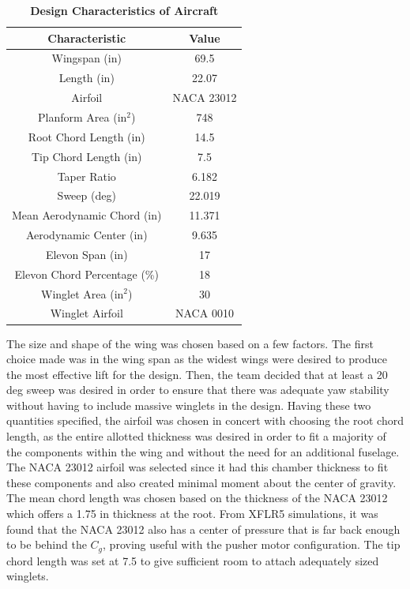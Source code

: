     \begin{table}[H]
    \begin{center}
    \caption{\textbf{Design Characteristics of Aircraft}} \label{table:design_char}
    \begin{tabular}{|c|c|} 
        \hline
        \textbf{Characteristic} & \textbf{Value} \\ \hline
        Wingspan (in) & 69.5 \\ \hline
        Length (in) & 22.07 \\ \hline
        Airfoil & NACA 23012 \\ \hline
        Planform Area (in$^2$) & 748 \\ \hline
        Root Chord Length (in) & 14.5 \\ \hline
        Tip Chord Length (in) & 7.5 \\ \hline
        Taper Ratio & 6.182 \\ \hline
        Sweep (deg) & 22.019 \\ \hline
        Mean Aerodynamic Chord (in) &  11.371 \\ \hline
        Aerodynamic Center (in) & 9.635 \\ \hline
        Elevon Span (in) & 17 \\ \hline
        Elevon Chord Percentage (\%) & 18 \\ \hline
        Winglet Area (in$^2$) & 30 \\ \hline
        Winglet Airfoil & NACA 0010 \\
        \hline
    \end{tabular}
    \end{center}
    \end{table}

    The size and shape of the wing was chosen based on a few factors. The first choice made was in the wing span as the widest wings were desired to produce the most effective lift for the design. Then, the team decided that at least a 20 deg sweep was desired in order to ensure that there was adequate yaw stability without having to include massive winglets in the design. Having these two quantities specified, the airfoil was chosen in concert with choosing the root chord length, as the entire allotted thickness was desired in order to fit a majority of the components within the wing and without the need for an additional fuselage. The NACA 23012 airfoil was selected since it had this chamber thickness to fit these components and also created minimal moment about the center of gravity. The mean chord length was chosen based on the thickness of the NACA 23012 which offers a 1.75 in thickness at the root. From XFLR5 simulations, it was found that the NACA 23012 also has a center of pressure that is far back enough to be behind the $C_g$, proving useful with the pusher motor configuration. The tip chord length was set at 7.5 to give sufficient room to attach adequately sized winglets. \\

